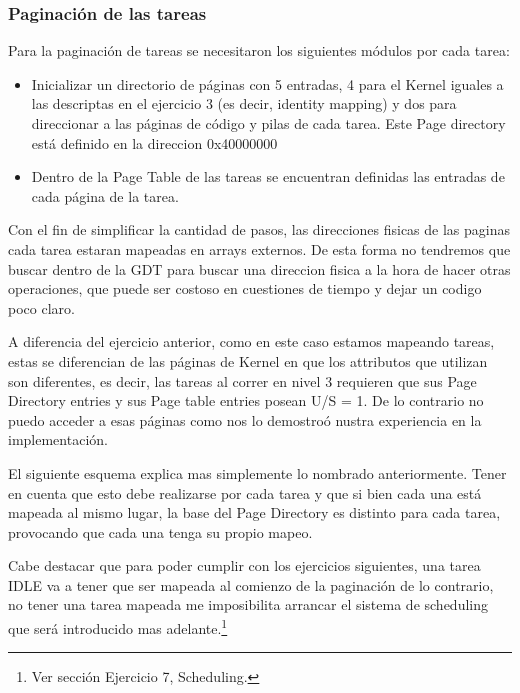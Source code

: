 \subsubsection{Paginaci\'on de las tareas}

Para la paginaci\'on de tareas se necesitaron los siguientes m\'odulos por cada tarea:
\begin{itemize}
 \item Inicializar un directorio de p\'aginas con 5 entradas, 4 para el Kernel iguales a las descriptas en el ejercicio 3 (es decir, identity mapping) 
 y dos para direccionar a las p\'aginas de c\'odigo y pilas de cada tarea. Este Page directory est\'a definido en la direccion 0x40000000
 \item Dentro de la Page Table de las tareas se encuentran definidas las entradas de cada p\'agina de la tarea. 
\end{itemize}

Con el fin de simplificar la cantidad de pasos, las direcciones fisicas de las paginas cada tarea estaran mapeadas en arrays externos. De esta forma no
tendremos que buscar dentro de la GDT para buscar una direccion fisica a la hora de hacer otras operaciones, que puede ser costoso en cuestiones de tiempo
y dejar un codigo poco claro.

A diferencia del ejercicio anterior, como en este caso estamos mapeando tareas, estas se diferencian de las p\'aginas de Kernel en que
los attributos que utilizan son diferentes, es decir, las tareas al correr en nivel 3 requieren que sus Page Directory entries y sus
Page table entries posean U/S = 1. De lo contrario no puedo acceder a esas p\'aginas como nos lo demostro\'o nustra experiencia en la
implementaci\'on.

El siguiente esquema explica mas simplemente lo nombrado anteriormente. Tener en cuenta que esto debe realizarse por cada tarea y que si
bien cada una est\'a mapeada al mismo lugar, la base del Page Directory es distinto para cada tarea, provocando que cada una tenga su
propio mapeo. %




Cabe destacar que para poder cumplir con los ejercicios siguientes, una tarea IDLE va a tener que ser mapeada al comienzo de la paginaci\'on
de lo contrario, no tener una tarea mapeada me imposibilita arrancar el sistema de scheduling que ser\'a introducido mas adelante.\footnote{Ver
secci\'on Ejercicio 7, Scheduling.}
